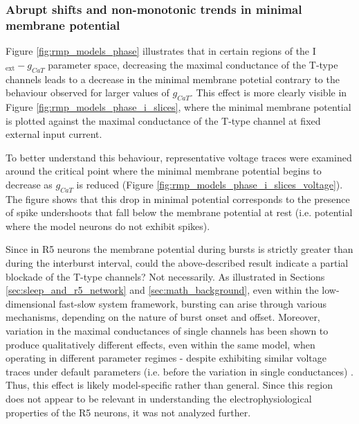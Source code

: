 \documentclass[../main.tex]{subfiles}
\begin{document}
\color{black}


\subsubsection{Abrupt shifts and non-monotonic trends in minimal membrane potential}

\noindent Figure \ref{fig:rmp_models_phase} illustrates that in certain regions of the I$_{\text{ext}}-g_{CaT}$ parameter space, decreasing the maximal conductance of the T-type channels leads to a decrease in the minimal membrane potetial contrary to the behaviour observed for larger values of $g_{CaT}$. This effect is more clearly visible in Figure \ref{fig:rmp_models_phase_i_slices}, where the minimal membrane potential is plotted against the maximal conductance of the T-type channel at fixed external input current.

To better understand this behaviour, representative voltage traces were examined around the critical point where the minimal membrane potential begins to decrease as $g_{CaT}$ is reduced (Figure \ref{fig:rmp_models_phase_i_slices_voltage}). The figure shows that this drop in minimal potential corresponds to the presence of spike undershoots that fall below the membrane potential at rest (i.e. potential where the model neurons do not exhibit spikes).

Since in R5 neurons the membrane potential during bursts is strictly greater than during the interburst interval, could the above-described result indicate a partial blockade of the T-type channels?
Not necessarily. As illustrated in Sections \ref{sec:sleep_and_r5_network} and \ref{sec:math_background}, even within the low-dimensional fast-slow system framework, bursting can arise through various mechanisms, depending on the nature of burst onset and offset. Moreover, variation in the maximal conductances of single channels has been shown to produce qualitatively different effects, even within the same model, when operating in different parameter regimes - despite exhibiting similar voltage traces under default parameters (i.e. before the variation in single conductances) \parencite{alonsoVisualizationCurrentsNeural2019}. Thus, this effect is likely model-specific rather than general. Since this region does not appear to be relevant in understanding the electrophysiological properties of the R5 neurons, it was not analyzed further.
\end{document}
